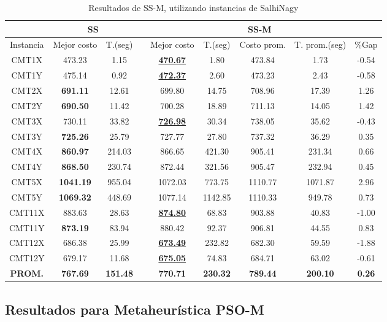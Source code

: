 \begin{table}[h]
\caption{ Resultados de SS-M, utilizando instancias de SalhiNagy}
\centering
\scriptsize
\begin{tabular*}{1.00\textwidth}{@{\extracolsep{\fill}} |c||c c||c c c c c c|}
\hline
 & \multicolumn{2}{c||}{\bf{SS}} & \multicolumn{6}{c|}{\bf{SS-M}}\\\hline
Instancia & Mejor costo & T.(seg) & & Mejor costo & T.(seg) & Costo prom. & T. prom.(seg) & \%Gap\\ [0.5ex]
\hline\hline
CMT1X & 473.23 & 1.15 & & \bf{\underline{470.67}} & 
1.80 & 473.84 & 1.73 & -0.54\\CMT1Y & 475.14 & 0.92 & & \bf{\underline{472.37}} & 
2.60 & 473.23 & 2.43 & -0.58\\CMT2X & \bf{691.11} & 12.61 & & 
699.80 & 14.75 & 708.96 & 17.39 & 1.26\\CMT2Y & \bf{690.50} & 11.42 & & 
700.28 & 18.89 & 711.13 & 14.05 & 1.42\\CMT3X & 730.11 & 33.82 & & \bf{\underline{726.98}} & 
30.34 & 738.05 & 35.62 & -0.43\\CMT3Y & \bf{725.26} & 25.79 & & 
727.77 & 27.80 & 737.32 & 36.29 & 0.35\\CMT4X & \bf{860.97} & 214.03 & & 
866.65 & 421.30 & 905.41 & 231.34 & 0.66\\CMT4Y & \bf{868.50} & 230.74 & & 
872.44 & 321.56 & 905.47 & 232.94 & 0.45\\CMT5X & \bf{1041.19} & 955.04 & & 
1072.03 & 773.75 & 1110.77 & 1071.87 & 2.96\\CMT5Y & \bf{1069.32} & 448.69 & & 
1077.14 & 1142.85 & 1110.33 & 949.78 & 0.73\\CMT11X & 883.63 & 28.63 & & \bf{\underline{874.80}} & 
68.83 & 903.88 & 40.83 & -1.00\\CMT11Y & \bf{873.19} & 83.94 & & 
880.42 & 92.37 & 906.81 & 44.55 & 0.83\\CMT12X & 686.38 & 25.99 & & \bf{\underline{673.49}} & 
232.82 & 682.30 & 59.59 & -1.88\\CMT12Y & 679.17 & 11.68 & & \bf{\underline{675.05}} & 
74.83 & 684.71 & 63.02 & -0.61\\\hline\hline\bf{PROM.} & 
\bf{767.69} & \bf{151.48} & & \bf{770.71} & \bf{230.32} & \bf{789.44} & \bf{200.10} & \bf{0.26}\\[1ex]\hline
\end{tabular*}
\label{table:finalS-SCA}
\end{table}

\subsection{Resultados para Metaheurística PSO-M}


